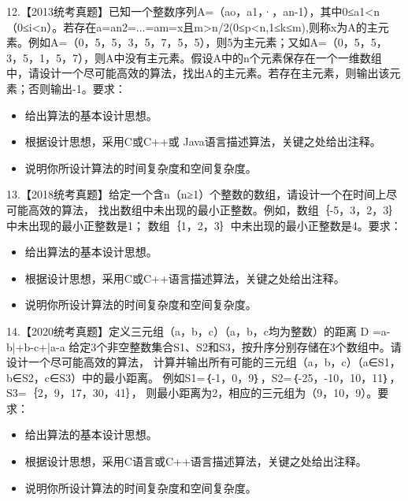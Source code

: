 \documentclass[b5paper,11pt]{article}
\begin{document}
\psplit

\begin{question}
12.【2013统考真题】已知一个整数序列A=（ao，a1，·，an-1），其中0≤a1<n（0≤i<n）。若存在a=an2=...=am=x且m>n/2(0≤p<n,1≤k≤m),则称x为A的主元素。例如A=（0，5，5，3，5，7，5，5），则5为主元素；又如A=（0，5，5，3，5，1，5，7），则A中没有主元素。假设A中的n个元素保存在一个一维数组中，请设计一个尽可能高效的算法，找出A的主元素。若存在主元素，则输出该元素；否则输出-1。要求：
\begin{itemize}
  \item [1）] 给出算法的基本设计思想。
  \item [2）] 根据设计思想，采用C或C++或 Java语言描述算法，关键之处给出注释。
  \item [3）] 说明你所设计算法的时间复杂度和空间复杂度。
\end{itemize}
\end{question}

\psplit

\begin{question}
13.【2018统考真题】给定一个含n（n≥1）个整数的数组，请设计一个在时间上尽可能高效的算法，
找出数组中未出现的最小正整数。例如，数组｛-5，3，2，3｝中未出现的最小正整数是1；
数组｛1，2，3｝中未出现的最小正整数是4。要求：
\begin{itemize}
  \item [1）] 给出算法的基本设计思想。
  \item [2）] 根据设计思想，采用C或C++语言描述算法，关键之处给出注释。
  \item [3）] 说明你所设计算法的时间复杂度和空间复杂度。
\end{itemize}
\end{question}

\psplit

\begin{question}
14.【2020统考真题】定义三元组（a，b，c）（a，b，c均为整数）的距离 D =a-b|+b-c+|a-a
给定3个非空整数集合S1、S2和S3，按升序分别存储在3个数组中。请设计一个尽可能高效的算法，
计算并输出所有可能的三元组（a，b，c）（a∈S1，b∈S2，c∈S3）中的最小距离。
例如S1=｛-1，0，9｝，S2=｛-25，-10，10，11｝，S3=｛2，9，17，30，41｝，
则最小距离为2，相应的三元组为（9，10，9）。要求：
\begin{itemize}
  \item [1）] 给出算法的基本设计思想。
  \item [2）] 根据设计思想，采用C语言或C++语言描述算法，关键之处给出注释。
  \item [3）] 说明你所设计算法的时间复杂度和空间复杂度。
\end{itemize}
\end{question}
\end{document}
